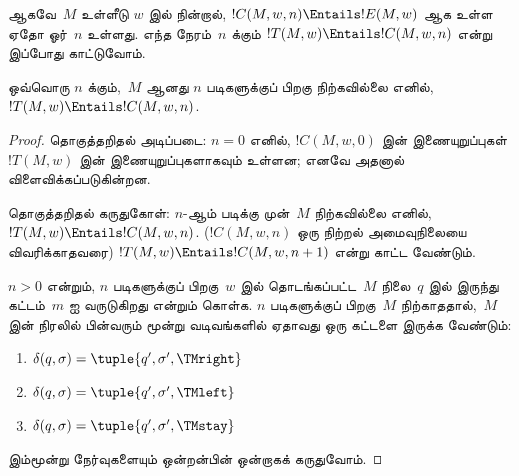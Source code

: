 \documentclass[../../../include/open-logic-section]{subfiles}
\begin{document}
\begin{explain}
ஆகவே~$M$ உள்ளீடு $w$ இல் நின்றால்,
$!C(M, w, n) \Entails !E(M,w)$ ஆக உள்ள ஏதோ ஓர்~$n$ உள்ளது. எந்த
நேரம்~$n$ க்கும் $!T(M, w) \Entails !C(M, w, n)$ என்று இப்போது
காட்டுவோம்.
\end{explain}

\begin{lem}
ஒவ்வொரு $n$ க்கும்,~$M$ ஆனது $n$ படிகளுக்குப் பிறகு
நிற்கவில்லை எனில், $!T(M, w) \Entails !C(M, w, n)$.
\end{lem}

\begin{proof}
தொகுத்தறிதல் அடிப்படை: $n = 0$ எனில், $!C(M, w, 0)$ இன்
இணையுறுப்புகள் $!T(M, w)$ இன் இணையுறுப்புகளாகவும் உள்ளன; எனவே
அதனால் விளைவிக்கப்படுகின்றன.

தொகுத்தறிதல் கருதுகோள்: $n$-ஆம் படிக்கு முன்~$M$ நிற்கவில்லை எனில்,
$!T(M,w) \Entails !C(M, w, n)$. ($!C(M, w, n)$ ஒரு நிற்றல்
அமைவுநிலையை விவரிக்காதவரை)
$!T(M, w) \Entails !C(M, w, n+1)$ என்று காட்ட வேண்டும்.

$n > 0$ என்றும், $n$ படிகளுக்குப் பிறகு~$w$ இல் தொடங்கப்பட்ட~$M$
நிலை~$q$ இல் இருந்து கட்டம்~$m$ ஐ வருடுகிறது என்றும் கொள்க.
$n$ படிகளுக்குப் பிறகு~$M$ நிற்காததால்,~$M$ இன் நிரலில் பின்வரும்
மூன்று வடிவங்களில் ஏதாவது ஒரு கட்டளை இருக்க வேண்டும்:

\begin{enumerate} 
\item {} $\delta(q, \sigma) = \tuple{q', \sigma', \TMright}$

\item {} $\delta(q, \sigma) = \tuple{q', \sigma', \TMleft}$

\item {} $\delta(q, \sigma) = \tuple{q', \sigma', \TMstay}$
\end{enumerate}

இம்மூன்று நேர்வுகளையும் ஒன்றன்பின் ஒன்றாகக் கருதுவோம்.


\end{proof}
\end{document}
